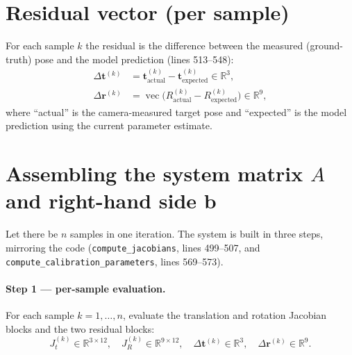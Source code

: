 \documentclass[11pt]{article}
\newcommand{\R}{\mathbb{R}}
\newcommand{\vecop}{\operatorname{vec}}
\begin{document}
\section{Residual vector (per sample)}
For each sample $k$ the residual is the difference between the measured
(ground-truth) pose and the model prediction (lines 513--548):
\begin{align}
\Delta \bm{t}^{(k)} &= \bm{t}^{(k)}_{\text{actual}} - \bm{t}^{(k)}_{\text{expected}} \in \R^{3},\\
\Delta \bm{r}^{(k)} &= \vecop\!\big(R^{(k)}_{\text{actual}} - R^{(k)}_{\text{expected}}\big) \in \R^{9},
\end{align}
where ``actual'' is the camera-measured target pose and ``expected'' is the model
prediction using the current parameter estimate.

\section{Assembling the system matrix \texorpdfstring{$A$}{A} and right-hand side \texorpdfstring{$\bm{b}$}{b}}
\label{sec:assembly}
Let there be $n$ samples in one iteration. The system is built in three steps,
mirroring the code (\texttt{compute\_jacobians}, lines 499--507, and
\texttt{compute\_calibration\_parameters}, lines 569--573).

\paragraph{Step 1 --- per-sample evaluation.}
For each sample $k = 1,\dots,n$, evaluate the translation and rotation Jacobian
blocks and the two residual blocks:
\[
J_t^{(k)} \in \R^{3\times12}, \quad
J_R^{(k)} \in \R^{9\times12}, \quad
\Delta\bm{t}^{(k)} \in \R^{3}, \quad
\Delta\bm{r}^{(k)} \in \R^{9}.
\]
\end{document}
